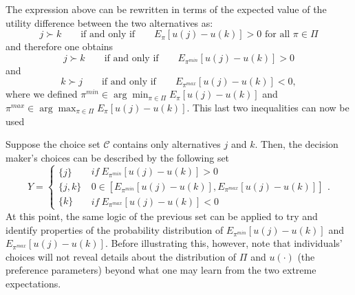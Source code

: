 \documentclass{article}
\begin{document}
The expression above can be rewritten in terms of the expected value of the
utility difference between the two alternatives as:%
\begin{equation*}
j\succ k\qquad \text{if and only if}\qquad E_{\pi }\left[ u\left( j\right)
-u\left( k\right) \right] >0\text{ for all }\pi \in \Pi
\end{equation*}%
and therefore one obtains%
\begin{equation*}
j\succ k\qquad \text{if and only if}\qquad E_{\pi ^{min}}\left[ u\left(
j\right) -u\left( k\right) \right] >0
\end{equation*}%
and 
\begin{equation*}
k\succ j\qquad \text{if and only if}\qquad E_{\pi ^{max}}\left[ u\left(
j\right) -u\left( k\right) \right] <0,
\end{equation*}%
where we defined $\pi ^{min}\in \arg \min_{\pi \in \Pi }E_{\pi }\left[
u\left( j\right) -u\left( k\right) \right] $ and $\pi ^{max}\in \arg
\max_{\pi \in \Pi }E_{\pi }\left[ u\left( j\right) -u\left( k\right) \right] 
$. This last two inequalities can now be used

Suppose the choice set $\mathcal{C}$ contains only alternatives $j$ and $k$.
Then, the decision maker's choices can be described by the following set%
\begin{equation*}
Y=\left\{ 
\begin{array}{c}
\{j\} \\ 
\{j,k\} \\ 
\{k\}%
\end{array}%
\ 
\begin{array}{c}
if\ E_{\pi ^{min}}\left[ u\left( j\right) -u\left( k\right) \right] >0 \\ 
0\in \left[ E_{\pi ^{min}}\left[ u\left( j\right) -u\left( k\right) \right]
,E_{\pi ^{max}}\left[ u\left( j\right) -u\left( k\right) \right] \right] \\ 
if\ E_{\pi ^{max}}\left[ u\left( j\right) -u\left( k\right) \right] <0%
\end{array}%
\right. .
\end{equation*}%
At this point, the same logic of the previous set can be applied to try and
identify properties of the probability distribution of $E_{\pi ^{min}}\left[
u\left( j\right) -u\left( k\right) \right] $ and $E_{\pi ^{max}}\left[
u\left( j\right) -u\left( k\right) \right] $. Before illustrating this,
however, note that individuals' choices will not reveal details about the
distribution of $\Pi $ and $u\left( \cdot \right) $ (the preference
parameters) beyond what one may learn from the two extreme expectations.
\end{document}
